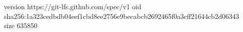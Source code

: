 version https://git-lfs.github.com/spec/v1
oid sha256:1a323cedbdb04eef1cbd8ee2756e9becabcb2692465f0a3cff21644cb2d06343
size 635850
